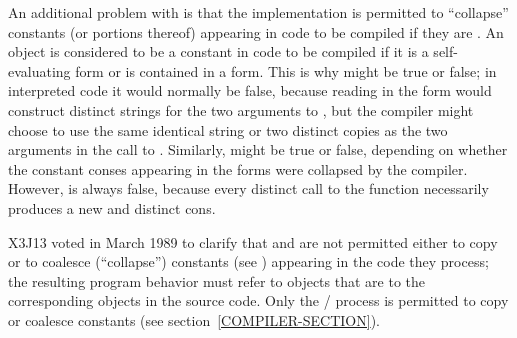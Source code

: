 \begin{defun}[Function]
\begin{obsolete}
An additional problem with  is that the implementation is permitted
to ``collapse'' constants (or portions thereof)
appearing in code to be compiled if they are
.  An object is considered to be a constant in code to be compiled
if it is a self-evaluating form or is contained in a  form.
This is why  might be true or false; in interpreted
code it would normally be false, because reading in the
form  would construct distinct strings for the two
arguments to , but the compiler might choose to use the same
identical string or two distinct copies as the two arguments in the
call to .  Similarly,  might be true
or false, depending on whether the constant conses appearing in the
 forms were collapsed by the compiler.  However,
 is always false, because every distinct
call to the  function necessarily produces a new and distinct cons.
\end{obsolete}

\begin{newer}
X3J13 voted in March 1989  to clarify that
 and  are not permitted either to copy or
to coalesce (``collapse'') constants (see )
appearing in the code they process; the resulting
program behavior must refer to objects that are  to the
corresponding objects in the source code.
Only the / process is permitted
to copy or coalesce constants (see section~\ref{COMPILER-SECTION}).
\end{newer}
\end{defun}

